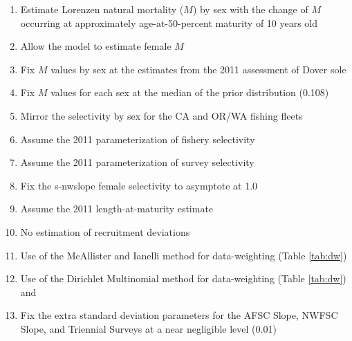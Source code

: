 \documentclass[11pt,
  english,
  a4paper,
]{article}
\begin{document}
\begin{enumerate}
   
  \item Estimate Lorenzen natural mortality ($M$) by sex with the change of $M$ occurring at approximately age-at-50-percent maturity of 10 years old

  \item Allow the model to estimate female $M$

  \item Fix $M$ values by sex at the estimates from the 2011 assessment of Dover sole
  
  \item Fix $M$ values for each sex at the median of the prior distribution (0.108)
  
  \item Mirror the selectivity by sex for the CA and OR/WA fishing fleets

  \item Assume the 2011 parameterization of fishery selectivity

  \item Assume the 2011 parameterization of survey selectivity

  \item Fix the \gls{s-nwslope} female selectivity to asymptote at 1.0

  \item Assume the 2011 length-at-maturity estimate
  
  \item No estimation of recruitment deviations
  
  \item Use of the McAllister and Ianelli method for data-weighting (Table \ref{tab:dw})
  
  \item Use of the Dirichlet Multinomial method for data-weighting (Table \ref{tab:dw}) and
  
  \item Fix the extra standard deviation parameters for the AFSC Slope, NWFSC Slope, and Triennial Surveys at a near negligible level (0.01)

\end{enumerate}

\end{document}
